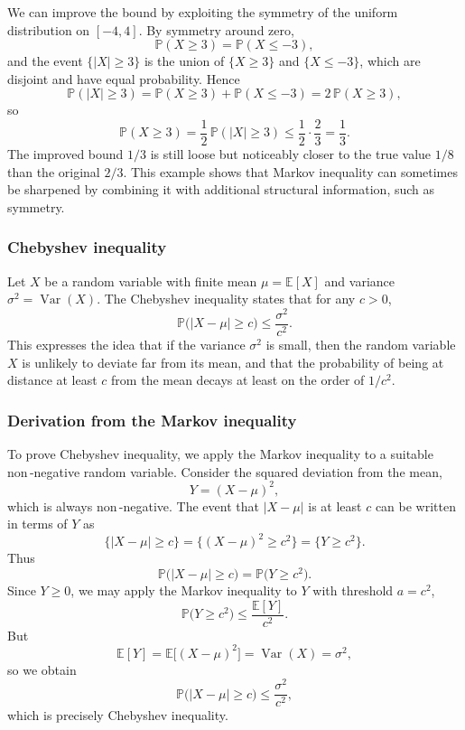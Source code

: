 We can improve the bound by exploiting the symmetry of the uniform distribution on \([-4,4]\).  
By symmetry around zero,
\[
\mathbb{P}(X \ge 3) = \mathbb{P}(X \le -3),
\]
and the event \(\{|X| \ge 3\}\) is the union of \(\{X \ge 3\}\) and \(\{X \le -3\}\), which are disjoint and have equal probability.  
Hence
\[
\mathbb{P}(|X| \ge 3)
=
\mathbb{P}(X \ge 3) + \mathbb{P}(X \le -3)
=
2 \,\mathbb{P}(X \ge 3),
\]
so
\[
\mathbb{P}(X \ge 3)
=
\frac{1}{2}\,\mathbb{P}(|X| \ge 3)
\le
\frac{1}{2}\cdot \frac{2}{3}
=
\frac{1}{3}.
\]
The improved bound \(1/3\) is still loose but noticeably closer to the true value \(1/8\) than the original \(2/3\).  
This example shows that Markov inequality can sometimes be sharpened by combining it with additional structural information, such as symmetry.


\subsubsection{Chebyshev inequality}

Let \(X\) be a random variable with finite mean \(\mu = \mathbb{E}[X]\) and variance \(\sigma^{2} = \operatorname{Var}(X)\).  
The Chebyshev inequality states that for any \(c > 0\),
\[
\mathbb{P}\big(|X - \mu| \ge c\big)
\le
\frac{\sigma^{2}}{c^{2}}.
\]
This expresses the idea that if the variance \(\sigma^{2}\) is small, then the random variable \(X\) is unlikely to deviate far from its mean, and that the probability of being at distance at least \(c\) from the mean decays at least on the order of \(1/c^{2}\).  

\subsubsection{Derivation from the Markov inequality}

To prove Chebyshev inequality, we apply the Markov inequality to a suitable non\,-negative random variable.  
Consider the squared deviation from the mean,
\[
Y = (X - \mu)^{2},
\]
which is always non\,-negative.  
The event that \(|X - \mu|\) is at least \(c\) can be written in terms of \(Y\) as
\[
\{|X - \mu| \ge c\} = \{(X - \mu)^{2} \ge c^{2}\} = \{Y \ge c^{2}\}.
\]
Thus
\[
\mathbb{P}\big(|X - \mu| \ge c\big)
=
\mathbb{P}\big(Y \ge c^{2}\big).
\]
Since \(Y \ge 0\), we may apply the Markov inequality to \(Y\) with threshold \(a = c^{2}\),
\[
\mathbb{P}\big(Y \ge c^{2}\big)
\le
\frac{\mathbb{E}[Y]}{c^{2}}.
\]
But
\[
\mathbb{E}[Y] = \mathbb{E}\big[(X - \mu)^{2}\big] = \operatorname{Var}(X) = \sigma^{2},
\]
so we obtain
\[
\mathbb{P}\big(|X - \mu| \ge c\big)
\le
\frac{\sigma^{2}}{c^{2}},
\]
which is precisely Chebyshev inequality.  

